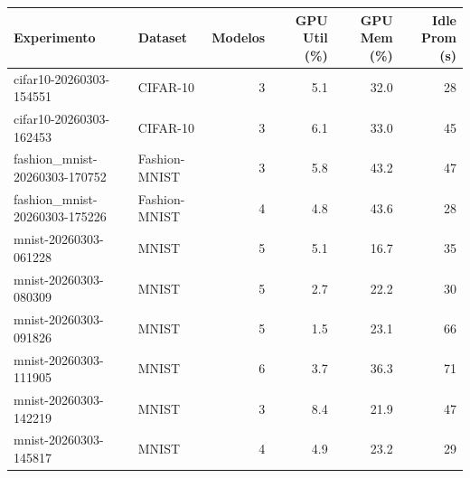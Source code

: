 \begin{tabular}{llrrrr}
\toprule
Experimento & Dataset & Modelos & GPU Util (\%) & GPU Mem (\%) & Idle Prom (s) \\
\midrule
cifar10-20260303-154551 & CIFAR-10 & 3 & 5.1 & 32.0 & 28 \\
cifar10-20260303-162453 & CIFAR-10 & 3 & 6.1 & 33.0 & 45 \\
fashion_mnist-20260303-170752 & Fashion-MNIST & 3 & 5.8 & 43.2 & 47 \\
fashion_mnist-20260303-175226 & Fashion-MNIST & 4 & 4.8 & 43.6 & 28 \\
mnist-20260303-061228 & MNIST & 5 & 5.1 & 16.7 & 35 \\
mnist-20260303-080309 & MNIST & 5 & 2.7 & 22.2 & 30 \\
mnist-20260303-091826 & MNIST & 5 & 1.5 & 23.1 & 66 \\
mnist-20260303-111905 & MNIST & 6 & 3.7 & 36.3 & 71 \\
mnist-20260303-142219 & MNIST & 3 & 8.4 & 21.9 & 47 \\
mnist-20260303-145817 & MNIST & 4 & 4.9 & 23.2 & 29 \\
\bottomrule
\end{tabular}
